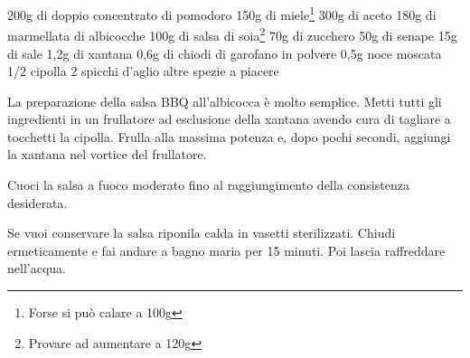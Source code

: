 \label{salsa-bbq}
\serves{-}
\begin{ingreds}
	200g di doppio concentrato di pomodoro
	150g di miele\footnote{Forse si può calare a 100g}
	300g di aceto
	180g di marmellata di albicocche
	100g di salsa di soia\footnote{Provare ad aumentare a 120g}
	70g di zucchero
	50g di senape
	15g di sale
	1,2g di xantana
	0,6g di chiodi di garofano in polvere
	0,5g noce moscata
	1/2 cipolla
	2 spicchi d'aglio
	altre spezie a piacere

\end{ingreds}

\begin{method}
La preparazione della salsa BBQ all'albicocca è molto semplice. Metti tutti gli ingredienti in un frullatore ad esclusione della xantana avendo cura di tagliare a tocchetti la cipolla. Frulla alla massima potenza e, dopo pochi secondi, aggiungi la xantana nel vortice del frullatore.

Cuoci la salsa a fuoco moderato fino al raggiungimento della consistenza desiderata.

Se vuoi conservare la salsa riponila calda in vasetti sterilizzati. Chiudi ermeticamente e fai andare a bagno maria per 15 minuti. Poi lascia raffreddare nell'acqua.
\end{method}



